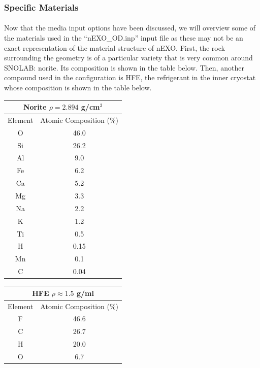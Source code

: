 \subsubsection{Specific Materials}
\paragraph{}
Now that the media input options have been discussed, we will overview some of the materials used in the ``nEXO\_OD.inp'' input file as these may not be an exact representation of the material structure of nEXO. First, the rock surrounding the geometry is of a particular variety that is very common around SNOLAB: norite. Its composition is shown in the table below. Then, another compound used in the configuration is HFE, the refrigerant in the inner cryostat whose composition is shown in the table below. 

\begin{center}
    \label{tab:norite}
    \begin{tabular}[h]{|c|c|}
        \hline
        \multicolumn{2}{|c|}{Norite $\rho = 2.894 $ g/cm$^3$} \\
        \hline
        \hline
        Element & Atomic Composition (\%) \\
        \hline
        O & 46.0 \\
        Si & 26.2 \\
        Al & 9.0 \\
        Fe & 6.2 \\
        Ca & 5.2 \\
        Mg & 3.3 \\
        Na & 2.2 \\
        K & 1.2 \\
        Ti & 0.5 \\
        H & 0.15 \\
        Mn & 0.1 \\
        C & 0.04 \\
        \hline
    \end{tabular}
    \quad
    \label{tab:HFE}
    \begin{tabular}[h]{|c|c|}
        \hline
        \multicolumn{2}{|c|}{HFE $\rho \approx 1.5 $ g/ml} \\
        \hline
        \hline
        Element & Atomic Composition (\%) \\
        \hline
        F & 46.6 \\
        C & 26.7 \\
        H & 20.0 \\
        O & 6.7 \\
        \hline
    \end{tabular}
\end{center}
